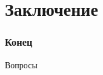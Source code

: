 \documentclass[unicode, notheorems]{beamer}
\begin{document}






\section{Заключение}
\begin{frame}
    \frametitle{Конец} 
    \centering Вопросы
\end{frame}
\end{document}
